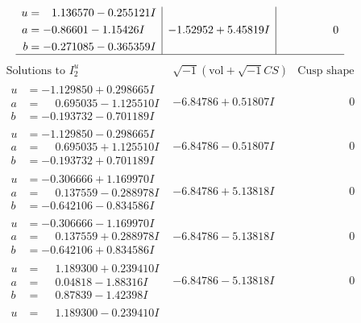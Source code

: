 \documentclass[1p]{elsarticle_modified}
\theoremstyle{definition}
\newcommand{\I}{\sqrt{-1}}
\begin{document}
$$\begin{array}{c|c|c}
\begin{aligned}
u &= \phantom{-}1.136570 - 0.255121 I \\
a &= -0.86601 - 1.15426 I \\
b &= -0.271085 - 0.365359 I\end{aligned}
 & -1.52952 + 5.45819 I & \phantom{-0.000000 } 0\\
 \hline 
 \end{array}$$\newpage$$\begin{array}{c|c|c}  
\text{Solutions to }I^u_{2}& \I (\text{vol} + \sqrt{-1}CS) & \text{Cusp shape}\\
 \hline 
\begin{aligned}
u &= -1.129850 + 0.298665 I \\
a &= \phantom{-}0.695035 - 1.125510 I \\
b &= -0.193732 - 0.701189 I\end{aligned}
 & -6.84786 + 0.51807 I & \phantom{-0.000000 } 0 \\ \hline\begin{aligned}
u &= -1.129850 - 0.298665 I \\
a &= \phantom{-}0.695035 + 1.125510 I \\
b &= -0.193732 + 0.701189 I\end{aligned}
 & -6.84786 - 0.51807 I & \phantom{-0.000000 } 0 \\ \hline\begin{aligned}
u &= -0.306666 + 1.169970 I \\
a &= \phantom{-}0.137559 - 0.288978 I \\
b &= -0.642106 - 0.834586 I\end{aligned}
 & -6.84786 + 5.13818 I & \phantom{-0.000000 } 0 \\ \hline\begin{aligned}
u &= -0.306666 - 1.169970 I \\
a &= \phantom{-}0.137559 + 0.288978 I \\
b &= -0.642106 + 0.834586 I\end{aligned}
 & -6.84786 - 5.13818 I & \phantom{-0.000000 } 0 \\ \hline\begin{aligned}
u &= \phantom{-}1.189300 + 0.239410 I \\
a &= \phantom{-}0.04818 - 1.88316 I \\
b &= \phantom{-}0.87839 - 1.42398 I\end{aligned}
 & -6.84786 - 5.13818 I & \phantom{-0.000000 } 0 \\ \hline\begin{aligned}
u &= \phantom{-}1.189300 - 0.239410 I \\

\end{aligned}
\end{array}$$
\end{document}
